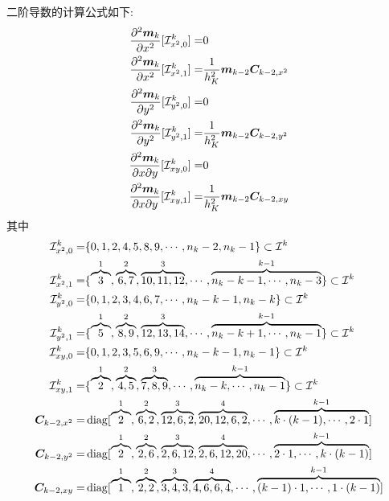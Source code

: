 \documentclass{article}
\begin{document}
二阶导数的计算公式如下:
\begin{align*}
    \frac{\partial^2{\boldsymbol m}_k}{\partial x^2}[{\mathcal I}_{x^2, 0}^k] =&  0 \\
    \frac{\partial^2{\boldsymbol m}_k}{\partial x^2}[{\mathcal I}_{x^2, 1}^k] =& 
    \frac{1}{h_K^2}{\boldsymbol m}_{k-2}{\boldsymbol C}_{k-2, x^2}  \\
    \frac{\partial^2{\boldsymbol m}_k}{\partial y^2}[{\mathcal I}_{y^2, 0}^k] =&  0 \\
    \frac{\partial^2{\boldsymbol m}_k}{\partial y^2}[{\mathcal I}_{y^2, 1}^k] =& 
    \frac{1}{h_K^2}{\boldsymbol m}_{k-2}{\boldsymbol C}_{k-2, y^2}  \\
    \frac{\partial^2{\boldsymbol m}_k}{\partial x\partial y}[{\mathcal I}_{xy, 0}^k] =&  0 \\
    \frac{\partial^2{\boldsymbol m}_k}{\partial x\partial y}[{\mathcal I}_{xy, 1}^k] =&
    \frac{1}{h_K^2}{\boldsymbol m}_{k-2}{\boldsymbol C}_{k-2, xy}
\end{align*}
其中
\begin{align*}
    {\mathcal I}_{x^2, 0}^k = &\{0, 1, 2, 4, 5, 8, 9, \cdots, n_k-2, n_k-1\}
    \subset {\mathcal I}^k\\
    {\mathcal I}_{x^2, 1}^k = &\{
        \overbrace{3}^1, 
        \overbrace{6, 7}^2, 
        \overbrace{10, 11, 12}^3, 
        \cdots, 
        \overbrace{n_k-k-1, \cdots, n_k - 3}^{k-1}\}\subset{\mathcal I}^k\\
    {\mathcal I}_{y^2, 0}^k = &\{0, 1, 2, 3, 4, 6, 7, \cdots, n_k-k-1, n_k-k\}
    \subset{\mathcal I}^k\\
    {\mathcal I}_{y^2, 1}^k = &\{
        \overbrace{5}^1, 
        \overbrace{8, 9}^2, 
        \overbrace{12, 13, 14}^3, 
        \cdots, 
        \overbrace{n_k-k+1, \cdots, n_k - 1}^{k-1}\}
        \subset{\mathcal I}^k\\
    {\mathcal I}_{xy, 0}^k = &\{0, 1, 2, 3, 5, 6, 9, \cdots, n_k-k-1, n_k-1\}
    \subset{\mathcal I}^k\\
    {\mathcal I}_{xy, 1}^k = &\{
        \overbrace{2}^1, 
        \overbrace{4, 5}^2, 
        \overbrace{7, 8, 9}^3, 
        \cdots, 
        \overbrace{n_k-k, \cdots, n_k - 1}^{k-1}\}
        \subset{\mathcal I}^k \\
    {\boldsymbol C}_{k-2, x^2} = &\operatorname{diag}[
        \overbrace{2}^1, 
        \overbrace{6, 2}^2, 
        \overbrace{12, 6, 2}^3, 
        \overbrace{20, 12, 6, 2}^4, 
        \cdots, 
        \overbrace{k\cdot(k-1), \cdots, 2\cdot1}^{k-1}] \\
    {\boldsymbol C}_{k-2, y^2} = &\operatorname{diag}[
        \overbrace{2}^1, 
        \overbrace{2, 6}^2, 
        \overbrace{2, 6, 12}^3, 
        \overbrace{2, 6, 12, 20}^4, 
        \cdots, 
    \overbrace{2\cdot 1, \cdots, k\cdot(k-1)}^{k-1}] \\
    {\boldsymbol C}_{k-2, xy} = &\operatorname{diag}[
        \overbrace{1}^1, 
        \overbrace{2, 2}^2, 
        \overbrace{3, 4, 3}^3, 
        \overbrace{4, 6, 6, 4}^4, 
        \cdots, 
    \overbrace{(k-1)\cdot 1, \cdots, 1\cdot (k-1)}^{k-1}] \\
\end{align*}
\end{document}
